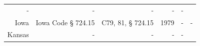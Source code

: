\documentclass[]{article}
\begin{document}
\begin{longtable}[c]{@{}rrrrrr@{}}
\begin{minipage}[t]{0.21\columnwidth}
-
\strut\end{minipage} &
\begin{minipage}[t]{0.22\columnwidth}\raggedleft\strut
-
\strut\end{minipage} &
\begin{minipage}[t]{0.10\columnwidth}\raggedleft\strut
-
\strut\end{minipage} &
\begin{minipage}[t]{0.10\columnwidth}\raggedleft\strut
-
\strut\end{minipage} &
\begin{minipage}[t]{0.10\columnwidth}\raggedleft\strut
-
\strut\end{minipage}\tabularnewline
\begin{minipage}[t]{0.10\columnwidth}\raggedleft\strut
Iowa
\strut\end{minipage} &
\begin{minipage}[t]{0.21\columnwidth}\raggedleft\strut
Iowa Code § 724.15
\strut\end{minipage} &
\begin{minipage}[t]{0.22\columnwidth}\raggedleft\strut
C79, 81, § 724.15
\strut\end{minipage} &
\begin{minipage}[t]{0.10\columnwidth}\raggedleft\strut
1979
\strut\end{minipage} &
\begin{minipage}[t]{0.10\columnwidth}\raggedleft\strut
-
\strut\end{minipage} &
\begin{minipage}[t]{0.10\columnwidth}\raggedleft\strut
-
\strut\end{minipage}\tabularnewline
\begin{minipage}[t]{0.10\columnwidth}\raggedleft\strut
Kansas
\strut\end{minipage} &
\begin{minipage}[t]{0.21\columnwidth}\raggedleft\strut
-
\strut\end{minipage} &
\begin{minipage}[t]{0.22\columnwidth}\raggedleft\strut
-
\strut\end{minipage} &
\begin{minipage}[t]{0.10\columnwidth}\raggedleft\strut
-
\strut\end{minipage} &
\begin{minipage}[t]{0.10\columnwidth}\raggedleft\strut
-
\strut\end{minipage} &
\begin{minipage}[t]{0.10\columnwidth}\raggedleft\strut

\end{minipage}
\end{longtable}
\end{document}
